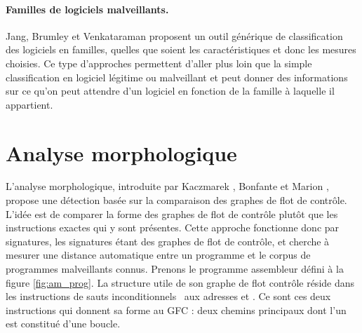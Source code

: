 \paragraph{Familles de logiciels malveillants.}
Jang, Brumley et Venkataraman \cite{JBV11} proposent un outil générique de classification des logiciels en familles, quelles que soient les caractéristiques et donc les mesures choisies. Ce type d'approches permettent d'aller plus loin que la simple classification en logiciel légitime ou malveillant et peut donner des informations sur ce qu'on peut attendre d'un logiciel en fonction de la famille à laquelle il appartient.

\section{Analyse morphologique}
L'analyse morphologique, introduite par Kaczmarek \cite{Kacz08}, Bonfante et Marion \cite{BKM08}, propose une détection 
basée sur la comparaison des graphes de flot de contrôle. L'idée est de comparer la forme des graphes de flot de contrôle plutôt que les instructions exactes qui y sont présentes.
Cette approche fonctionne donc par signatures, les signatures étant des graphes de flot de contrôle, et cherche à mesurer une distance automatique entre un programme et le corpus de programmes malveillants connus.
Prenons le programme assembleur défini à la figure \ref{fig:am_prog}. La structure utile de son graphe de flot contrôle réside dans les instructions de sauts inconditionnels \jne\ aux adresses  et . Ce sont ces deux instructions qui donnent sa forme au GFC : deux chemins principaux dont l'un est constitué d'une boucle.


